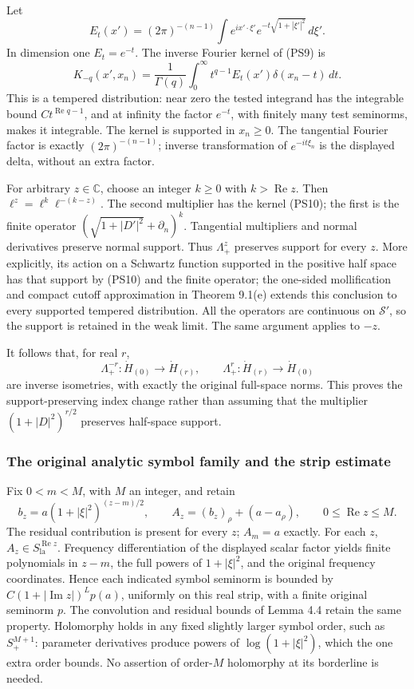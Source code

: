 \documentclass[
  11pt,
]{article}
\begin{document}
Let \[
 E_t(x')=(2\pi)^{-(n-1)}
       \int e^{ix'\cdot\xi'}e^{-t\sqrt{1+|\xi'|^2}}\,d\xi'.
\] In dimension one \(E_t=e^{-t}\). The inverse Fourier kernel of (PS9)
is \[
 K_{-q}(x',x_n)=\frac1{\Gamma(q)}
        \int_0^\infty t^{q-1}E_t(x')\delta(x_n-t)\,dt .
 \tag{PS10}
\] This is a tempered distribution: near zero the tested integrand has
the integrable bound \(C t^{\operatorname{Re}q-1}\), and at infinity the
factor \(e^{-t}\), with finitely many test seminorms, makes it
integrable. The kernel is supported in \(x_n\ge0\). The tangential
Fourier factor is exactly \((2\pi)^{-(n-1)}\); inverse transformation of
\(e^{-it\xi_n}\) is the displayed delta, without an extra factor.

For arbitrary \(z\in\mathbb C\), choose an integer \(k\ge0\) with
\(k>\operatorname{Re}z\). Then \(\ell^z=\ell^k\ell^{-(k-z)}\). The
second multiplier has the kernel (PS10); the first is the finite
operator \((\sqrt{1+|D'|^2}+\partial_n)^k\). Tangential multipliers and
normal derivatives preserve normal support. Thus \(\Lambda_+^z\)
preserves support for every \(z\). More explicitly, its action on a
Schwartz function supported in the positive half space has that support
by (PS10) and the finite operator; the one-sided mollification and
compact cutoff approximation in Theorem 9.1(e) extends this conclusion
to every supported tempered distribution. All the operators are
continuous on \(\mathcal S'\), so the support is retained in the weak
limit. The same argument applies to \(-z\).

It follows that, for real \(r\), \[
 \Lambda_+^{-r}:\dot H_{(0)}\longrightarrow\dot H_{(r)},
 \qquad
 \Lambda_+^{r}:\dot H_{(r)}\longrightarrow\dot H_{(0)}
 \tag{PS11}
\] are inverse isometries, with exactly the original full-space norms.
This proves the support-preserving index change rather than assuming
that the multiplier \((1+|D|^2)^{r/2}\) preserves half-space support.

\subsubsection{The original analytic symbol family and the strip
estimate}\label{the-original-analytic-symbol-family-and-the-strip-estimate}

Fix \(0<m<M\), with \(M\) an integer, and retain \[
 b_z=a(1+|\xi|^2)^{(z-m)/2},\qquad
 A_z=(b_z)_\rho+(a-a_\rho),\qquad 0\le\operatorname{Re}z\le M.
 \tag{PS12}
\] The residual contribution is present for every \(z\); \(A_m=a\)
exactly. For each \(z\),
\(A_z\in S^{\operatorname{Re}z}_{\mathrm{la}}\). Frequency
differentiation of the displayed scalar factor yields finite polynomials
in \(z-m\), the full powers of \(1+|\xi|^2\), and the original frequency
coordinates. Hence each indicated symbol seminorm is bounded by
\(C(1+|\operatorname{Im}z|)^L p(a)\), uniformly on this real strip, with
a finite original seminorm \(p\). The convolution and residual bounds of
Lemma 4.4 retain the same property. Holomorphy holds in any fixed
slightly larger symbol order, such as \(S^{M+1}_+\): parameter
derivatives produce powers of \(\log(1+|\xi|^2)\), which the one extra
order bounds. No assertion of order-\(M\) holomorphy at its borderline
is needed.
\end{document}
